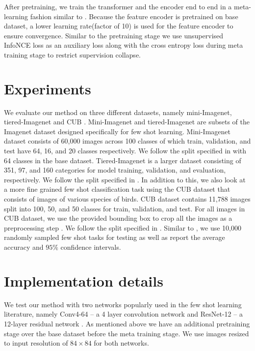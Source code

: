\documentclass{bmvc2k}
\begin{document}
After pretraining, we train the transformer and the encoder end to end in a meta-learning fashion similar to \cite{ye2020few}. Because the feature encoder is pretrained on base dataset, a lower learning rate(factor of 10) is used for the feature encoder to ensure convergence. Similar to the pretraining stage we  use unsupervised InfoNCE loss as an auxiliary loss along with the cross entropy loss during meta training stage to restrict supervision collapse.
 



\label{sec:blind}

\section{Experiments}

We evaluate our method on three different datasets, namely mini-Imagenet, tiered-Imagenet and CUB \cite{welinder2010caltech}. Mini-Imagenet and tiered-Imagenet are subsets of the Imagenet dataset designed specifically for few shot learning. Mini-Imagenet dataset consists of 60,000 images across 100 classes of which train, validation, and test have 64, 16, and 20 classes respectively. We follow the split specified in \cite{ravi2017optimization}  with 64 classes in the base dataset. Tiered-Imagenet is a larger dataset consisting of 351, 97, and 160 categories for model training, validation, and evaluation, respectively. We follow the split specified in \cite{ye2020few}. In addition to this, we also look at a more fine grained few shot classification task using the CUB dataset that consists of images of various species of birds. CUB dataset contains 11,788 images split into 100, 50, and 50  classes for train, validation, and test. For all images in CUB dataset, we use the provided bounding box to crop all the images as a preprocessing step \cite{triantafillou2017few}. We follow the split specified in \cite{ye2020few}.
 Similar to \cite{ye2020few, rusu2018metalearning}, we use 10,000 randomly sampled few shot tasks for testing as well as report the average accuracy and \(95\%\) confidence intervals.

\section{Implementation details}

We test our method with two networks popularly used in the few shot learning literature, namely Conv4-64 -- a 4 layer convolution network \cite{vinyals2016matching,snell2017prototypical,triantafillou2017few,ye2020few} and ResNet-12 -- a 12-layer residual network \cite{lee2019meta,ye2020few}. As mentioned above we have an additional pretraining stage over the base dataset before the meta training stage. We use images resized to input resolution of $84\times 84$ for both networks. 
\end{document}
